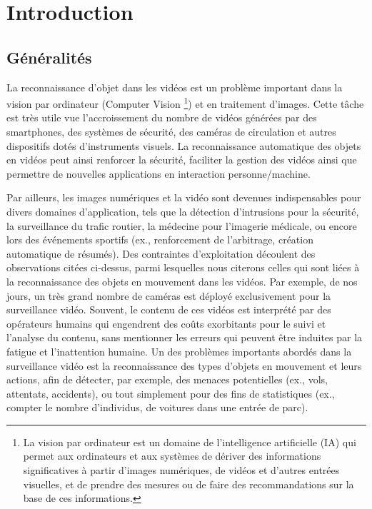 

\chapter{Introduction}
	\section{Généralités}

		La reconnaissance d'objet dans les vidéos est un problème important dans la vision par ordinateur (Computer Vision \footnote{La vision par ordinateur est un domaine de l'intelligence artificielle (IA) qui permet aux ordinateurs et aux systèmes de dériver des informations significatives à partir d'images numériques, de vidéos et d'autres entrées visuelles, et de prendre des mesures ou de faire des recommandations sur la base de ces informations.}) et en traitement d'images. Cette tâche est très utile vue l'accroissement du nombre de vidéos générées par des smartphones, des systèmes de sécurité, des caméras de circulation et autres dispositifs dotés d'instruments visuels. La reconnaissance automatique des objets en vidéos peut ainsi renforcer la sécurité, faciliter la gestion des vidéos ainsi que permettre de nouvelles applications en interaction personne/machine.
		
		Par ailleurs, les images numériques et la vidéo sont devenues indispensables pour divers domaines d'application, tels que la détection d'intrusions pour la sécurité, la surveillance du trafic routier, la médecine pour l'imagerie médicale, ou encore lors des événements sportifs (ex., renforcement de l'arbitrage, création automatique de résumés).
		Des contraintes d'exploitation découlent des observations citées ci-dessus, parmi lesquelles nous citerons celles qui sont liées à la reconnaissance des objets en mouvement dans les vidéos. Par exemple, de nos jours, un très grand nombre de caméras est déployé exclusivement pour la surveillance vidéo.\cite{ahadjitse2013reconnaissance} 
		Souvent, le contenu de ces vidéos est interprété par des opérateurs humains qui engendrent des coûts exorbitants pour le suivi et l'analyse du contenu, sans mentionner les erreurs qui peuvent être induites par la fatigue et l'inattention humaine. 
		Un des problèmes importants abordés dans la surveillance vidéo est la reconnaissance des types d'objets en mouvement et leurs actions, afin de détecter, par exemple, des menaces potentielles (ex., vols, attentats, accidents), ou tout simplement pour des fins de statistiques (ex., compter le nombre d'individus, de voitures dans une entrée de parc).
		
